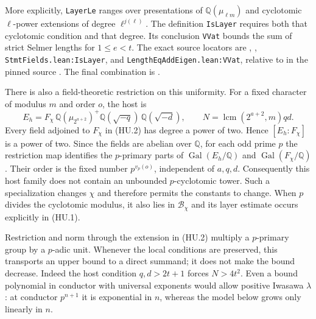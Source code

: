 More explicitly, \texttt{LayerLe} ranges over presentations of
$\mathbb Q(\mu_{\ell m})$ and cyclotomic $\ell$-power extensions of
degree $\ell^{j(\ell)}$.  The definition \texttt{IsLayer} requires
both that cyclotomic condition and that degree.  Its conclusion
\texttt{VVat} bounds the sum of strict Selmer lengths for $1\le e<t$.
The exact source locators are
,
,
\texttt{StmtFields.lean:IsLayer}, and
\texttt{LengthEqAddEigen.lean:VVat}, relative to
in the pinned source \cite{K17PinnedLeanMirror}.
The final combination is
.

There is also a field-theoretic restriction on this uniformity.
For a fixed character of modulus $m$ and order $o$, the host is
\[
 E_h=F_\chi\,\mathbb Q(\mu_{2^{a+2}})^+
           \mathbb Q(\sqrt{-q})\,\mathbb Q(\sqrt{-d}),
 \qquad N=\operatorname{lcm}(2^{a+2},m)qd.
 \tag{HU.2}
\]
Every field adjoined to $F_\chi$ in (HU.2) has degree a power of
two.  Hence $[E_h:F_\chi]$ is a power of two.  Since the fields
are abelian over $\mathbb Q$, for each odd prime $p$ the restriction
map identifies the $p$-primary parts of
$\operatorname{Gal}(E_h/\mathbb Q)$ and
$\operatorname{Gal}(F_\chi/\mathbb Q)$.  Their order is the fixed
number $p^{v_p(o)}$, independent of $a,q,d$.
Consequently this host family does not contain an unbounded
$p$-cyclotomic tower.  Such a specialization changes $\chi$ and
therefore permits the constants to change.  When $p$ divides the
cyclotomic modulus, it also lies in $\mathcal B_\chi$ and its layer
estimate occurs explicitly in (HU.1).

Restriction and norm through the extension in (HU.2) multiply a
$p$-primary group by a $p$-adic unit.  Whenever the local conditions
are preserved, this transports an upper bound to a direct summand;
it does not make the bound decrease.  Indeed the host condition
$q,d>2t+1$ forces $N>4t^2$.
Even a bound polynomial in conductor with universal exponents
would allow positive Iwasawa $\lambda$: at conductor $p^{n+1}$
it is exponential in $n$, whereas the model below grows only
linearly in $n$.

